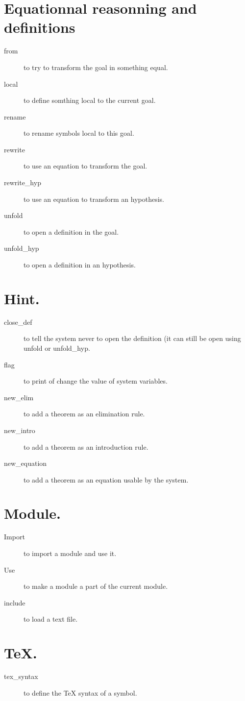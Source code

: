 \documentclass{article}
\begin{document}
\section{Equationnal reasonning and definitions}
\begin{description}
\item[from] to try to transform the goal in something equal.
\item[local] to define somthing local to the current goal.
\item[rename] to rename symbols local to this goal.
\item[rewrite] to use an equation to transform the goal.
\item[rewrite\_hyp] to use an equation to transform an hypothesis.
\item[unfold] to open a definition in the goal.
\item[unfold\_hyp] to open a definition in an hypothesis.
\end{description}

\section{Hint.}
\begin{description}
\item[close\_def] to tell the system never to open the definition (it can
still be open using unfold or unfold\_hyp.
\item[flag] to print of change the value of system variables.
\item[new\_elim] to add a theorem as an elimination rule.
\item[new\_intro] to add a theorem as an introduction rule.
\item[new\_equation] to add a theorem as an equation usable by the system.
\end{description}

\section{Module.}
\begin{description}
\item[Import] to import a module and use it.
\item[Use] to make a module a part of the current module.
\item[include] to load a text file.
\end{description}


\section{TeX.}
\begin{description}
\item[tex\_syntax] to define the TeX syntax of a symbol.
\end{description}
 
\end{document}
